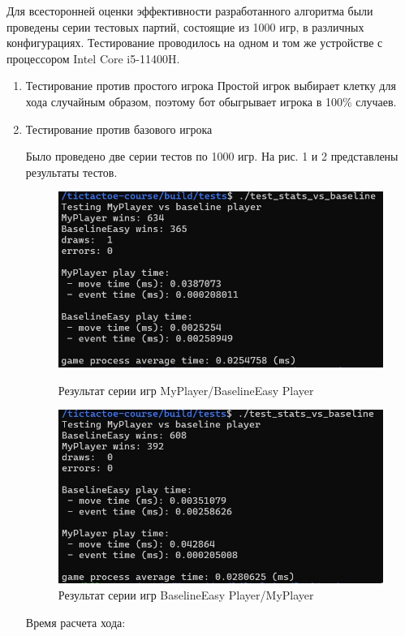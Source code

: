 \documentclass[a4paper]{article}
\begin{document}
Для всесторонней оценки эффективности разработанного алгоритма были проведены серии тестовых партий, состоящие из 1000 игр, в различных конфигурациях. Тестирование проводилось на одном и том же устройстве с процессором Intel Core i5-11400H.

\begin{enumerate}
	\item Тестирование против простого игрока
	Простой игрок выбирает клетку для хода случайным образом, поэтому бот обыгрывает игрока в 100\% случаев.
	
	\item Тестирование против базового игрока
	
	Было проведено две серии тестов по 1000 игр. На рис. 1 и 2 представлены результаты тестов.
	
	\begin{figure}[H]
		\centering
		\includegraphics{1}
		\caption{Результат серии игр MyPlayer/BaselineEasy Player}
		
		\includegraphics{2}
		\caption{Результат серии игр BaselineEasy Player/MyPlayer}
	\end{figure}
	
	Время расчета хода:
	

\end{enumerate}
\end{document}
